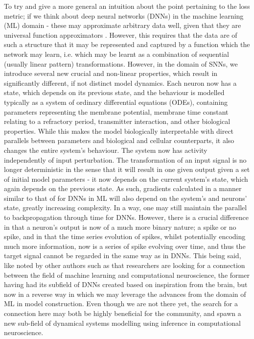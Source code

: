 \documentclass[mphil,deptreport,ianc]{infthesis} %
\begin{document}
To try and give a more general an intuition about the point pertaining to the loss metric; if we think about deep neural networks (DNNs) in the machine learning (ML) domain - these may approximate arbitrary data well, given that they are universal function approximators \cite{Hornik1989MultilayerApproximators}. 
However, this requires that the data are of such a structure that it may be represented and captured by a function which the network may learn, i.e. which may be learnt as a combination of sequential (usually linear pattern) transformations.
However, in the domain of SNNs, we introduce several new crucial and non-linear properties, which result in significantly different, if not distinct model dynamics. 
Each neuron now has a state, which depends on its previous state, and the behaviour is modelled typically as a system of ordinary differential equations (ODEs), containing parameters representing the membrane potential, membrane time constant relating to a refractory period, transmitter interaction, and other biological properties. 
While this makes the model biologically interpretable with direct parallels between parameters and biological and cellular counterparts, it also changes the entire system's behaviour.
The system now has activity independently of input perturbation. 
The transformation of an input signal is no longer deterministic in the sense that it will result in one given output given a set of initial model parameters - it now depends on the current system's state, which again depends on the previous state.
As such, gradients calculated in a manner similar to that of for DNNs in ML will also depend on the system's and neurons' state, greatly increasing complexity.
In a way, one may still maintain the parallel to backpropagation through time for DNNs. 
However, there is a crucial difference in that a neuron's output is now of a much more binary nature; a spike or no spike, and in that the time series evolution of spikes, whilst potentially encoding much more information, now is a series of spike evolving over time, and thus the target signal cannot be regarded in the same way as in DNNs.
This being said, like noted by other authors such as \cite{Sindaci2018} that researchers are looking for a connection between the field of machine learning and computational neuroscience, the former having had its subfield of DNNs created based on inspiration from the brain, but now in a reverse way in which we may leverage the advances from the domain of ML in model construction.
Even though we are not there yet, the search for a connection here may both be highly beneficial for the community, and spawn a new sub-field of dynamical systems modelling using inference in computational neuroscience.
\end{document}
